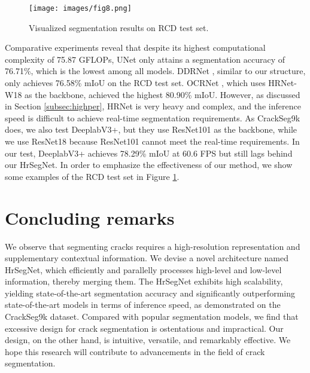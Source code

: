 \documentclass[preprint,12pt,authoryear]{elsarticle}
\begin{document}
\begin{center}
    \begin{figure}
        \centering
        \texttt{[image: images/fig8.png]}
        \caption{Visualized segmentation results on RCD test set.}
        \label{fig:fig8}
    \end{figure}
\end{center}


Comparative experiments reveal that despite its highest computational complexity of 75.87 GFLOPs, UNet \citep{ronneberger_u-net_2015} only attains a segmentation accuracy of 76.71\%, which is the lowest among all models. DDRNet \citep{pan_deep_2023}, similar to our structure, only achieves 76.58\% mIoU on the RCD test set. OCRNet \citep{vedaldi_object-contextual_2020}, which uses HRNet-W18 as the backbone, achieved the highest 80.90\% mIoU. However, as discussed in Section \ref{subsec:highper}, HRNet is very heavy and complex, and the inference speed is difficult to achieve real-time segmentation requirements. As CrackSeg9k does, we also test DeeplabV3+, but they use ResNet101 as the backbone, while we use ResNet18 because ResNet101 cannot meet the real-time requirements. In our test, DeeplabV3+ achieves 78.29\% mIoU at 60.6 FPS but still lags behind our HrSegNet. In order to emphasize the effectiveness of our method, we show some examples of the RCD test set in Figure \ref{fig:fig8}.






\section{Concluding remarks}
We observe that segmenting cracks requires a high-resolution representation and supplementary contextual information. We devise a novel architecture named HrSegNet, which efficiently and parallelly processes high-level and low-level information, thereby merging them. The HrSegNet exhibits high scalability, yielding state-of-the-art segmentation accuracy and significantly outperforming state-of-the-art models in terms of inference speed, as demonstrated on the CrackSeg9k dataset. Compared with popular segmentation models, we find that excessive design for crack segmentation is ostentatious and impractical. Our design, on the other hand, is intuitive, versatile, and remarkably effective. We hope this research will contribute to advancements in the field of crack segmentation.
\end{document}
